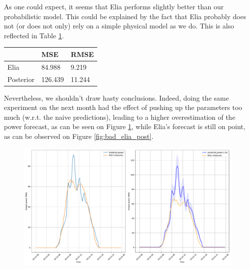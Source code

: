 \documentclass[a4paper, 12pt]{article}
\begin{document}
	As one could expect, it seems that Elia performs slightly better than our probabilistic model. This could be explained by the fact that Elia probably does not (or does not only) rely on a simple physical model as we do. This is also reflected in Table \ref{tab:elia_post}.
	
	\begin{table}[H]
    	\centering
        \begin{tabular}{l|l|l}
                  & MSE      & RMSE   \\ \hline
        Elia      & 84.988 & 9.219    \\ \hline
        Posterior & 126.439  & 11.244
        \end{tabular}
        \label{tab:elia_post}
    \end{table}
    
    Nevertheless, we shouldn't draw hasty conclusions. Indeed, doing the same experiment on the next month had the effect of pushing up the parameters too much (w.r.t. the naive predictions), leading to a higher overestimation of the power forecast, as can be seen on Figure \ref{fig:bad_naive_post}, while Elia's forecast is still on point, as can be observed on Figure \ref{fig:bad_elia_post}.
    
    \begin{figure}[H]
        \centering
        \includegraphics[width=\textwidth]{resources/pdf/bad_naive_post.pdf}
        \label{fig:bad_naive_post}
    \end{figure}
    
\end{document}
